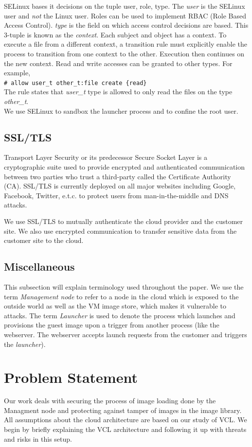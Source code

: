 \documentclass[10pt,twocolumn,pdftex]{article}
\begin{document}
SELinux bases it decisions on the tuple {user, role, type}. The \emph{user} is the SELinux user and \emph{not} the Linux user. Roles can be used to implement RBAC (Role Based Access Control). \emph{type} is the field on which access control decisions are based. This 3-tuple is known as the \emph{context}. Each subject and object has a context. To execute a file from a different context, a transition rule must explicitly enable the process to transition from one context to the other. Execution then continues on the new context. Read and write accesses can be granted to other types. For example,\\
{\tt \# allow user\_t other\_t:file create \{read\}} \\
The rule states that \emph{user\_t} type is allowed to only read the files on the type \emph{other\_t}.\\

We use SELinux to sandbox the launcher process and to confine the root user.

\subsection{SSL/TLS}
Transport Layer Security or its predecessor Secure Socket Layer is a cryptographic suite used to provide encrypted and authenticated communication between two parties who trust a third-party called the Certificate Authority (CA). SSL/TLS is currently deployed on all major websites including Google, Facebook, Twitter, e.t.c. to protect users from man-in-the-middle and DNS attacks.

We use SSL/TLS to mutually authenticate the cloud provider and the customer site. We also use encrypted communication to transfer sensitive data from the customer site to the cloud.

\subsection{Miscellaneous}
This subsection will explain terminology used throughout the paper.
We use the term \emph{Management node} to refer to a node in the cloud which is exposed to the outside world as well as the VM image store, which makes it vulnerable to attacks. The term \emph{Launcher} is used to denote the process which launches and provisions the guest image upon a trigger from another process (like the webserver. The webserver accepts launch requests from the customer and triggers the \emph{launcher}). 

\section{Problem Statement}
\label{sec:problem}
Our work deals with securing the process of image loading done by the Managment node and protecting against tamper of images in the image library. All assumptions about the cloud architecture are based on our study of VCL. We begin by briefly explaining the VCL architecture and following it up with threats and risks in this setup.
\end{document}
